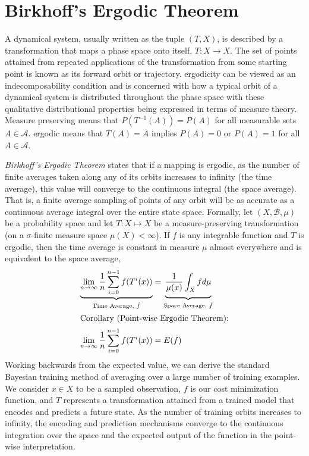 \documentclass{article}
\begin{document}
\section{Birkhoff's Ergodic Theorem}
A dynamical system, usually written as the tuple $(T, X)$, is described by a transformation that maps a phase space onto itself, $T: X \to X$. The set of points attained from repeated applications of the transformation from some starting point is known as its forward orbit or trajectory. ergodicity can be viewed as an indecomposability condition and is concerned with how a typical orbit of a dynamical system is distributed throughout the phase space with these qualitative distributional properties being expressed in terms of measure theory. Measure preserving means that $P(T^{-1}(A)) = P(A)$ for all measurable sets $A \in \mathcal A$. ergodic means that $T(A) = A$
implies $P(A) = 0$ or $P(A) = 1$ for all $A \in \mathcal A$.

\textit{Birkhoff's Ergodic Theorem} states that if a mapping is ergodic, as the number of finite averages taken along any of its orbits increases to infinity (the time average), this value will converge to the continuous integral (the space average). That is, a finite average sampling of points of any orbit will be as accurate as a continuous average integral over the entire state space.  Formally, let $(X, \mathcal{B}, \mu)$ be a probability space and let $T : X \mapsto X$ be a measure-preserving transformation (on a $\sigma$-finite measure space $\mu(X)< \infty$). If $f$ is any integrable function and $T$ is ergodic, then the time average is constant in measure $\mu$ almost everywhere and is equivalent to the space average,
\begin{align*}
    \underbrace{
        \lim_{n\to \infty} \frac{1}{n}\sum_{i=0}^{n-1}f(T^{i}(x))
    }_\textrm{Time Average, $\hat f$} 
    &=  \underbrace{
        \vphantom{ \sum_{i=0}^{n-1} }
        \frac{1}{\mu(x)} \int_{X} f d \mu
    }_\textrm{Space Average, $\bar f$}\\
    \intertext{Corollary (Point-wise Ergodic Theorem):}
        \lim_{n\to \infty} \frac{1}{n}\sum_{i=0}^{n-1}f(T^{i}(x))
    &=  
        \vphantom{ \sum_{i=0}^{n-1} }
        E(f)
\end{align*}
Working backwards from the expected value, we can derive the standard Bayesian training method of averaging over a large number of training examples.  We consider $x \in X$ to be a sampled observation, $f$ is our cost minimization function, and $T$ represents a transformation attained from a trained model that encodes and predicts a future state. As the number of training orbits increases to infinity, the encoding and prediction mechanisms converge to the continuous integration over the space and the expected output of the function in the point-wise interpretation.
\end{document}
